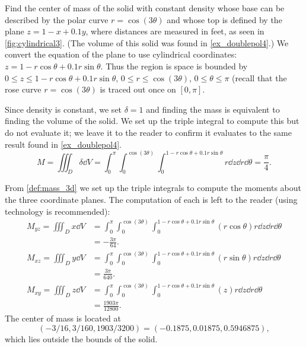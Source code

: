 \begin{example}\label{ex_cylindrical3}%
Find
%
%
the center of mass of the solid with constant density whose base can be described by the polar curve $r=\cos(3\theta)$ and whose top is defined by the plane $z=1-x+0.1y$, where distances are measured in feet, as seen in \autoref{fig:cylindrical3}. (The volume of this solid was found in \autoref{ex_doublepol4}.)
\solution
We convert the equation of the plane to use cylindrical coordinates: $z= 1-r\cos\theta+0.1r\sin\theta$. Thus the region is space is bounded by $0 \leq z \leq 1-r\cos\theta + 0.1r\sin\theta$, $0 \leq r \leq \cos(3\theta)$, $0 \leq \theta \leq \pi$ (recall that the rose curve $r=\cos(3\theta)$ is traced out once on $[0,\pi]$.

Since density is constant, we set $\delta = 1$ and finding the mass is equivalent to finding the volume of the solid. We set up the triple integral to compute this but do not evaluate it; we leave it to the reader to confirm it evaluates to the same result found in \autoref{ex_doublepol4}.
\[
M = \iiint_D\delta \dd V = \int_0^{\pi}\int_0^{\cos(3\theta)}\int_0^{1-r\cos\theta+0.1r\sin\theta} r\dd z\dd r\dd\theta =\frac\pi4.%
\]

From \autoref{def:mass_3d} we set up the triple integrals to compute the moments about the three coordinate planes. The computation of each is left to the reader (using technology is recommended):
\begin{align*}
M_{yz} = \iiint_D x\dd V &= \int_0^{\pi}\int_0^{\cos(3\theta)}\int_0^{1-r\cos\theta+0.1r\sin\theta} (r\cos\theta) r\dd z\dd r\dd\theta\\
&= -\frac{3\pi}{64}. %
\\
M_{xz} = \iiint_D y\dd V &= \int_0^{\pi}\int_0^{\cos(3\theta)}\int_0^{1-r\cos\theta+0.1r\sin\theta} (r\sin\theta) r\dd z\dd r\dd\theta\\
&= \frac{3\pi}{640}. %
\\
M_{xy} = \iiint_D z\dd V &= \int_0^{\pi}\int_0^{\cos(3\theta)}\int_0^{1-r\cos\theta+0.1r\sin\theta} (z) r\dd z\dd r\dd\theta\\
 &= \frac{1903\pi}{12800}. %
\end{align*}
The center of mass %
is located at
\[(-3/16, 3/160, 1903/3200)=(-0.1875,0.01875,0.5946875),\]
which lies outside the bounds of the solid.
\end{example}

